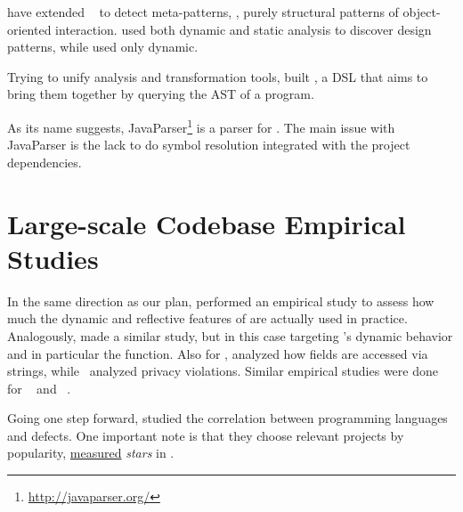 \cite{posnettTHEXMiningMetapatterns2010} have extended
\asm{}~\citep{brunetonASMCodeManipulation2002,kuleshovUsingASMFramework2007}
to detect meta-patterns, \ie,
purely structural patterns of object-oriented interaction.
\cite{huDynamicAnalysisDesign2008} used both dynamic and static analysis to discover design patterns, while \cite{arcelliDesignPatternDetection2008} used only dynamic.

Trying to unify analysis and transformation tools,
\cite{vinjuHowMakeBridge2006,klintRASCALDomainSpecific2009} built \rascal,
a DSL that aims to bring them together by querying the AST of a program.

As its name suggests, JavaParser\footnote{\url{http://javaparser.org/}}
is a parser for \java.
The main issue with JavaParser is the lack to do symbol resolution integrated with the project dependencies.


\section{Large-scale Codebase Empirical Studies}
\label{sec:lr:largescale}

In the same direction as our plan, \cite{callauHowWhyDevelopers2013} performed an empirical study to assess how much the dynamic and reflective features of \smalltalk{} are actually used in practice.
Analogously, \cite{richardsAnalysisDynamicBehavior2010,richardsEvalThatMen2011} made a similar study, but in this case targeting \javascript{}'s dynamic behavior and in particular the  function. 
Also for \javascript{}, \cite{madsenStringAnalysisDynamic2014} analyzed how fields are accessed via strings, while~\cite{jangEmpiricalStudyPrivacyviolating2010} analyzed privacy violations. 
Similar empirical studies were done for \php{}~\cite{hillsEmpiricalStudyPHP2013,dahseExperienceReportEmpirical2015,doyleEmpiricalStudyEvolution2011} and \swift{}~\cite{reboucasEmpiricalStudyUsage2016}.  

Going one step forward, \cite{rayLargescaleStudyProgramming2017} studied the correlation between programming languages and defects. 
One important note is that they choose relevant projects by popularity,
\underline{measured} \emph{stars} in \github{}.


